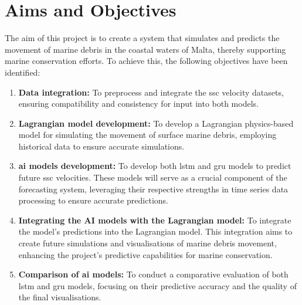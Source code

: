 \section{Aims and Objectives}
\label{sec:aims_and_objectives}
The aim of this project is to create a system that simulates and predicts the movement of marine debris in the coastal waters of Malta, thereby supporting marine conservation efforts. To achieve this, the following objectives have been identified:
\begin{enumerate}[label=\textbf{0\arabic*.}] 
    \item \textbf{Data integration:} To preprocess and integrate the \acrshort{ssc} velocity datasets, ensuring compatibility and consistency for input into both models.
    \item \textbf{Lagrangian model development:} To develop a Lagrangian physics-based model for simulating the movement of surface marine debris, employing historical data to ensure accurate simulations.
    \item \textbf{\acrshort{ai} models development:} To develop both \acrshort{lstm} and \acrshort{gru} models to predict future \acrshort{ssc} velocities. These models will serve as a crucial component of the forecasting system, leveraging their respective strengths in time series data processing to ensure accurate predictions.
    \item \textbf{Integrating the AI models with the Lagrangian model:} To integrate the model’s predictions into the Lagrangian model. This integration aims to create future simulations and visualisations of marine debris movement, enhancing the project’s predictive capabilities for marine conservation.
    \item \textbf{Comparison of \acrshort{ai} models:} To conduct a comparative evaluation of both \acrshort{lstm} and \acrshort{gru} models, focusing on their predictive accuracy and the quality of the final visualisations.
\end{enumerate}

